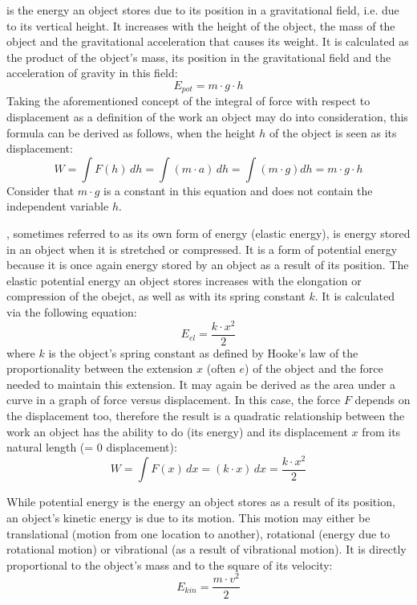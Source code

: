 \begin{itemize}
	 is the energy an object stores due to its position in a gravitational field, i.e. due to its vertical height. It increases with the height of the object, the mass of the object and the gravitational acceleration that causes its weight. It is calculated as the product of the object's mass, its position in the gravitational field and the acceleration of gravity in this field: $$E_{pot} = m \cdot g \cdot h$$ Taking the aforementioned concept of the integral of force with respect to displacement as a definition of the work an object may do into consideration, this formula can be derived as follows, when the height $h$ of the object is seen as its displacement: $$W = \int F(h) \, dh = \int (m \cdot a) \, dh = \int (m \cdot g) dh = m \cdot g \cdot h$$ Consider that $m \cdot g$ is a constant in this equation and does not contain the independent variable $h$.

	, sometimes referred to as its own form of energy (elastic energy), is energy stored in an object when it is stretched or compressed. It is a form of potential energy because it is once again energy stored by an object as a result of its position. The elastic potential energy an object stores increases with the elongation or compression of the obejct, as well as with its spring constant $k$. It is calculated via the following equation: $$E_{el} = \frac{k \cdot x^2}{2}$$ where $k$ is the object's spring constant as defined by Hooke's law of the proportionality between the extension $x$ (often $e$) of the object and the force needed to maintain this extension. It may again be derived as the area under a curve in a graph of force versus displacement. In this case, the force $F$ depends on the displacement too, therefore the result is a quadratic relationship between the work an object has the ability to do (its energy) and its displacement $x$ from its natural length (= 0 displacement): $$W = \int F(x) \, dx = (k \cdot x) \, dx = \frac{k \cdot x^2}{2}$$
\end{itemize}


While potential energy is the energy an object stores as a result of its position, an object's kinetic energy is due to its motion. This motion may either be translational (motion from one location to another), rotational (energy due to rotational motion) or vibrational (as a result of vibrational motion). It is directly proportional to the object's mass and to the square of its velocity: $$E_{kin} = \frac{m \cdot v^2}{2}$$

